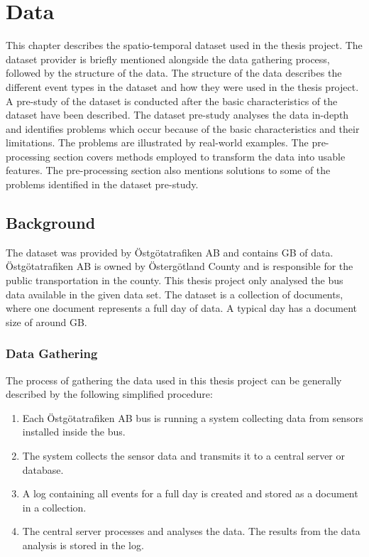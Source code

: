\chapter{Data}
\label{cha:data}

This chapter describes the spatio-temporal dataset used in the thesis project.
The dataset provider is briefly mentioned alongside the data gathering process, followed by the structure of the data.
The structure of the data describes the different event types in the dataset and how they were used in the thesis project.
A pre-study of the dataset is conducted after the basic characteristics of the dataset have been described.
The dataset pre-study analyses the data in-depth and identifies problems which occur because of the basic characteristics and their limitations.
The problems are illustrated by real-world examples.
The pre-processing section covers methods employed to transform the data into usable features.
The pre-processing section also mentions solutions to some of the problems identified in the dataset pre-study.

\section{Background}
The dataset was provided by Östgötatrafiken AB and contains GB of data.
Östgötatrafiken AB is owned by Östergötland County and is responsible for the public transportation in the county.
This thesis project only analysed the bus data available in the given data set.
The dataset is a collection of documents, where one document represents a full day of data.
A typical day has a document size of around GB.

\subsection{Data Gathering}
The process of gathering the data used in this thesis project can be generally described by the following simplified procedure:
\begin{enumerate}
    \item Each Östgötatrafiken AB bus is running a system collecting data from sensors installed inside the bus.
    \item The system collects the sensor data and transmits it to a central server or database.
    \item A log containing all events for a full day is created and stored as a document in a collection.
    \item The central server processes and analyses the data. The results from the data analysis is stored in the log.
\end{enumerate}

